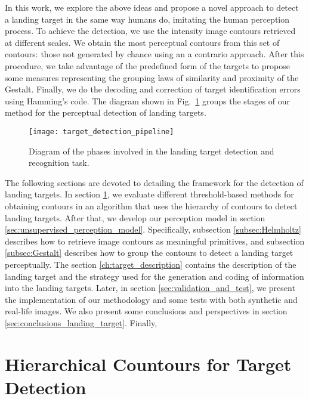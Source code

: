 In this work, we explore the above ideas and propose a novel approach to detect a landing target in the same way humans do, imitating the human perception process. To achieve the detection, we use the intensity image contours retrieved at different scales. We obtain the most perceptual contours from this set of contours: those not generated by chance using an a contrario approach. After this procedure, we take advantage of the predefined form of the targets to propose some measures representing the grouping laws of similarity and proximity of the Gestalt. Finally, we do the decoding and correction of target identification errors using Hamming's code. The diagram shown in Fig.\ \ref{fig:target_detection_pipeline} groups the stages of our method for the perceptual detection of landing targets.

\begin{figure}[!ht]
    \centering
    \texttt{[image: target\_detection\_pipeline]}        
    \caption{Diagram of the phases involved in the landing target detection and recognition task.}\label{fig:target_detection_pipeline}
\end{figure}

The following sections are devoted to detailing the framework for the detection of landing targets. In section \ref{sec:hierarchical_target_detection}, we evaluate different threshold-based methods for obtaining contours in an algorithm that uses the hierarchy of contours to detect landing targets. After that, we develop our perception model in section \ref{sec:unsupervised_perception_model}. Specifically, subsection \ref{subsec:Helmholtz} describes how to retrieve image contours as meaningful primitives, and subsection \ref{subsec:Gestalt} describes how to group the contours to detect a landing target perceptually. The section \ref{ch:target_description} contains the description of the landing target and the strategy used for the generation and coding of information into the landing targets. Later, in section \ref{sec:validation_and_test}, we present the implementation of our methodology and some tests with both synthetic and real-life images. We also present some conclusions and perspectives in section \ref{sec:conclusions_landing_target}. Finally, 


\section{Hierarchical Countours for Target Detection}\label{sec:hierarchical_target_detection}

